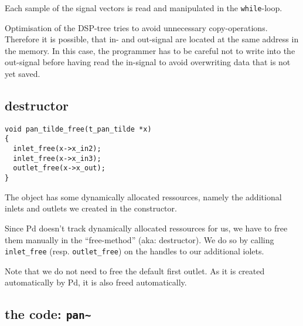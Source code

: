 \documentclass[12pt, a4paper,english,titlepage]{article}
\begin{document}
Each sample of the signal vectors is read and manipulated in the \verb+while+-loop.


Optimisation of the DSP-tree tries to avoid unnecessary copy-operations.
Therefore it is possible, that in- and out-signal are located
at the same address in the memory.
In this case, the programmer has to be careful not to write into the out-signal
before having read the in-signal to avoid overwriting data that is not yet saved.

\subsection{destructor}

\begin{verbatim}
void pan_tilde_free(t_pan_tilde *x)
{
  inlet_free(x->x_in2);
  inlet_free(x->x_in3);
  outlet_free(x->x_out);
}
\end{verbatim}

The object has some dynamically allocated ressources,
namely the additional inlets and outlets we created in the constructor.

Since Pd doesn't track dynamically allocated ressources for us,
we have to free them manually in the ``free-method'' (aka: destructor).
We do so by calling \verb+inlet_free+ (resp. \verb+outlet_free+) on the handles to
our additional iolets.

Note that we do not need to free the default first outlet.
As it is created automatically by Pd, it is also freed automatically.

\subsection{the code: \tt pan\~\/}
\end{document}
